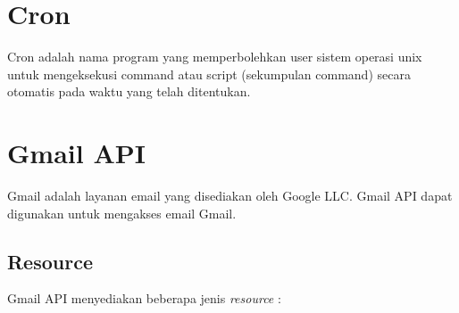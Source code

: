 \section{Cron}
Cron adalah nama program yang memperbolehkan user sistem operasi unix untuk mengeksekusi command atau script (sekumpulan command) secara otomatis pada waktu yang telah ditentukan.

\section{Gmail API ~\cite{gmail-api}}
\label{sec:gmail-api}
Gmail adalah layanan email yang disediakan oleh Google LLC. Gmail API dapat digunakan untuk mengakses email Gmail.

\subsection{Resource}
Gmail API menyediakan beberapa jenis \textit{resource} :
